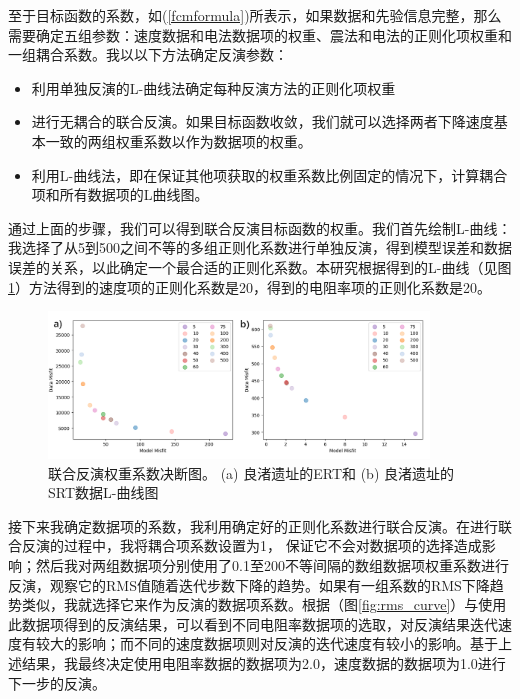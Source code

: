 至于目标函数的系数，如(\ref{fcmformula})所表示，如果数据和先验信息完整，那么需要确定五组参数：速度数据和电法数据项的权重、震法和电法的正则化项权重和一组耦合系数。我以以下方法确定反演参数：

\begin{itemize}
    \item 利用单独反演的L-曲线法确定每种反演方法的正则化项权重
    \item 进行无耦合的联合反演。如果目标函数收敛，我们就可以选择两者下降速度基本一致的两组权重系数以作为数据项的权重。
    \item 利用L-曲线法，即在保证其他项获取的权重系数比例固定的情况下，计算耦合项和所有数据项的L曲线图。
\end{itemize}

通过上面的步骤，我们可以得到联合反演目标函数的权重。我们首先绘制L-曲线：我选择了从5到500之间不等的多组正则化系数进行单独反演，得到模型误差和数据误差的关系，以此确定一个最合适的正则化系数。本研究根据得到的L-曲线（见图\ref{fig:L_curve}）方法得到的速度项的正则化系数是20，得到的电阻率项的正则化系数是20。

\begin{figure}[ht]
    \centering
    \includegraphics[width=0.9\textwidth]{figure/thesis/L_curve.png}
    \caption{联合反演权重系数决断图。 (a) 良渚遗址的ERT和 (b) 良渚遗址的SRT数据L-曲线图}
    \label{fig:L_curve}
\end{figure}

接下来我确定数据项的系数，我利用确定好的正则化系数进行联合反演。在进行联合反演的过程中，我将耦合项系数设置为1， 保证它不会对数据项的选择造成影响；然后我对两组数据项分别使用了0.1至200不等间隔的数组数据项权重系数进行反演，观察它的RMS值随着迭代步数下降的趋势。如果有一组系数的RMS下降趋势类似，我就选择它来作为反演的数据项系数。根据（图\ref{fig:rms_curve}）与使用此数据项得到的反演结果，可以看到不同电阻率数据项的选取，对反演结果迭代速度有较大的影响；而不同的速度数据项则对反演的迭代速度有较小的影响。基于上述结果，我最终决定使用电阻率数据的数据项为2.0，速度数据的数据项为1.0进行下一步的反演。

